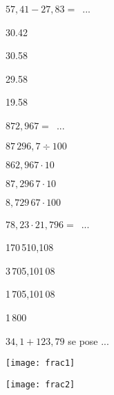 \begin{QCM}
\begin{GroupeQCM}
     \begin{exercice}
      $57,41 - 27,83 =$ ...
      \begin{ChoixQCM}{4}
      \item 30.42
      \item 30.58
      \item 29.58
      \item 19.58
      \end{ChoixQCM}
      \begin{corrige}
   \end{corrige}
    \end{exercice}


     \begin{exercice}
      $872,967 =$ ...
      \begin{ChoixQCM}{4}
      \item $87\,296,7 \div 100$
      \item $862,967 \cdot10$
      \item $87,296\,7 \cdot 10$
      \item $8,729\,67 \cdot 100$
      \end{ChoixQCM}
      \begin{corrige}
   \end{corrige}
    \end{exercice}
    
     \begin{exercice}
      $78,23 \cdot 21,796 =$ ...
      \begin{ChoixQCM}{4}
      \item 170\,510,108
      \item 3\,705,101\,08
      \item 1\,705,101\,08
      \item 1\,800
      \end{ChoixQCM}
      \begin{corrige}
   \end{corrige}
    \end{exercice}
    
     \begin{exercice}
      $34,1 + 123,79$ se pose ...
      \begin{ChoixQCM}{4}
      \item 
      
      \texttt{[image: frac1]}
      \item 
      
      \texttt{[image: frac2]}
      \item 
      

\end{ChoixQCM}
\end{exercice}
\end{GroupeQCM}
\end{QCM}
